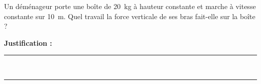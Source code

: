 Un déménageur porte une boîte de \qty{20}{kg} à hauteur constante et marche à vitesse constante sur \qty{10}{m}. Quel travail la force verticale de ses bras fait-elle sur la boîte ?

\choices

\noindent\textbf{Justification :} \hrulefill \\[2.5ex]
\rule{\linewidth}{0.4pt} \\[2.5ex]
\rule{\linewidth}{0.4pt}
\vfill
